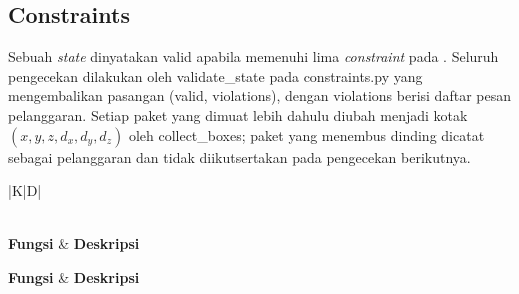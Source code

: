 \subsection{Constraints}
\label{sec:constraints-impl}

Sebuah \textit{state} dinyatakan valid apabila memenuhi lima \textit{constraint} pada . Seluruh pengecekan dilakukan oleh validate\_state pada constraints.py yang mengembalikan pasangan (valid, violations), dengan violations berisi daftar pesan pelanggaran. Setiap paket yang dimuat lebih dahulu diubah menjadi kotak $(x, y, z, d_x, d_y, d_z)$ oleh collect\_boxes; paket yang menembus dinding dicatat sebagai pelanggaran dan tidak diikutsertakan pada pengecekan berikutnya.

\begin{longtable}{|K|D|}
\caption{\textit{Constraint} dan fungsi pengecekannya}
\label{tab:constraints} \\
\hline
\textbf{Fungsi} & \textbf{Deskripsi} \\
\hline
\endfirsthead

\hline
\textbf{Fungsi} & \textbf{Deskripsi} \\
\hline
\endhead

\hline
{} \\
\endfoot

\hline
\endlastfoot


\end{longtable}
